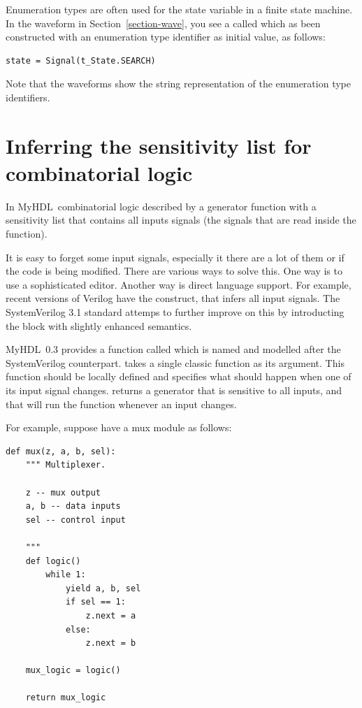 \documentclass{howto}
\newcommand{\myhdl}{\protect \mbox{MyHDL}}
\begin{document}
Enumeration types are often used for the state variable in a finite
state machine.  In the waveform in Section~\ref{section-wave}, you see
a  called  which as been constructed with an
enumeration type identifier as initial value, as follows:

\begin{verbatim}
state = Signal(t_State.SEARCH)
\end{verbatim}

Note that the waveforms show the string representation of the
enumeration type identifiers. 

\section{Inferring the sensitivity list for combinatorial logic}
In \myhdl\, combinatorial logic described by a generator function
with a sensitivity list that contains all inputs signals 
(the signals that are read inside the function). 

It is easy to forget some input signals, especially it there are a
lot of them or if the code is being modified. There are various ways
to solve this. One way is to use a sophisticated editor. Another way
is direct language support. For example, recent versions of Verilog
have the  construct, that infers all input
signals. The SystemVerilog 3.1 standard attemps to further improve on
this by introducting the  block with slightly
enhanced semantics.

\myhdl\ 0.3 provides a function called  which
is named and modelled after the SystemVerilog counterpart.
 takes a single classic function as its
argument. This function should be locally defined and specifies what
should happen when one of its input signal
changes.  returns a generator that is
sensitive to all inputs, and that will run the function
whenever an input changes.

For example, suppose have a mux module as follows:

\begin{verbatim}
def mux(z, a, b, sel):
    """ Multiplexer.
    
    z -- mux output
    a, b -- data inputs
    sel -- control input

    """
    def logic()
        while 1:
            yield a, b, sel
            if sel == 1:
                z.next = a
            else:
                z.next = b

    mux_logic = logic()

    return mux_logic
\end{verbatim}
\end{document}
